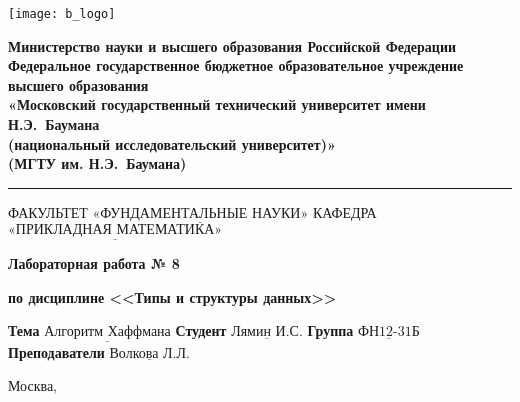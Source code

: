 \thispagestyle{empty}

\noindent \begin{minipage}{0.15\textwidth}
	\texttt{[image: b\_logo]}
\end{minipage}
\noindent\begin{minipage}{0.85\textwidth}\centering
	\textbf{Министерство науки и высшего образования Российской Федерации}\\
	\textbf{Федеральное государственное бюджетное образовательное учреждение высшего образования}\\
	\textbf{«Московский государственный технический университет имени Н.Э.~Баумана}\\
	\textbf{(национальный исследовательский университет)»}\\
	\textbf{(МГТУ им. Н.Э.~Баумана)}
\end{minipage}

\noindent\rule{\linewidth}{3pt}
\newline\newline
\noindent ФАКУЛЬТЕТ $\underline{\text{«ФУНДАМЕНТАЛЬНЫЕ НАУКИ»}}$ \newline\newline
\noindent КАФЕДРА $\underline{\text{«ПРИКЛАДНАЯ МАТЕМАТИКА»}}$

\vspace{1cm}

\begin{center}
	\noindent\centering
		\Large\textbf{Лабораторная работа № 8}
	
\end{center}
\begin{center}
	\noindent\centering
		\Large\textbf{по дисциплине <<Типы и структуры данных>>}
\end{center}

\noindent\textbf{Тема} $\underline{\text{Алгоритм Хаффмана}}$\newline\newline
\noindent\textbf{Студент} $\underline{\text{Лямин И.С.}}$\newline\newline
\noindent\textbf{Группа} $\underline{\text{ФН12-31Б}}$\newline\newline
\noindent\textbf{Преподаватели} $\underline{\text{Волкова Л.Л.}}$\newline

\begin{center}
	\vfill
	Москва,~\the\year 
\end{center}
\clearpage
